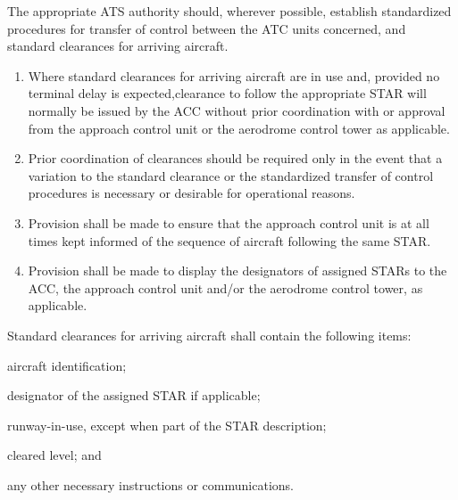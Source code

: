 \begin{enumeratesc}
    \begin{enumempty}
        \item The appropriate ATS authority should, wherever possible, establish standardized procedures for transfer of control between the ATC units concerned, and standard clearances for arriving aircraft.
    \end{enumempty}

    \begin{enumerate}
        \item Where standard clearances for arriving aircraft are in use and, provided no terminal delay is expected,clearance to follow the appropriate STAR will normally be issued by the ACC without prior coordination with or approval from the approach control unit or the aerodrome control tower as applicable.
        \item Prior coordination of clearances should be required only in the event that a variation to the standard clearance or the standardized transfer of control procedures is necessary or desirable for operational reasons.
        \item Provision shall be made to ensure that the approach control unit is at all times kept informed of the sequence of aircraft following the same STAR.
        \item Provision shall be made to display the designators of assigned STARs to the ACC, the approach control unit and/or the aerodrome control tower, as applicable.
    \end{enumerate}

    \begin{enumempty}
        \item Standard clearances for arriving aircraft shall contain the following items:
        \begin{enumalph}
            \item aircraft identification;
            \item designator of the assigned STAR if applicable;
            \item runway-in-use, except when part of the STAR description;
            \item cleared level; and
            \item any other necessary instructions or communications.
        \end{enumalph}


\end{enumempty}
\end{enumeratesc}
